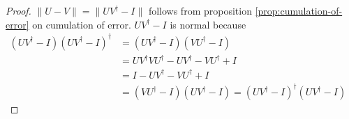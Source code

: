 \begin{proof}
	$ \| U - V \| = \| UV^\dagger - I \| $ follows from proposition \ref{prop:cumulation-of-error} on cumulation of error. 
	$UV^\dagger - I$ is normal because 
	\begin{align*}
		(UV^\dagger - I)(UV^\dagger - I)^\dagger 
		& = (UV^\dagger - I)(VU^\dagger - I) &\\
		& = UV^\dagger VU^\dagger - UV^\dagger - VU^\dagger + I &\\
		& = I - UV^\dagger - VU^\dagger + I &\\
		& = (VU^\dagger - I)(UV^\dagger - I) = (UV^\dagger - I)^\dagger (UV^\dagger - I) &
	\end{align*}
\end{proof}

